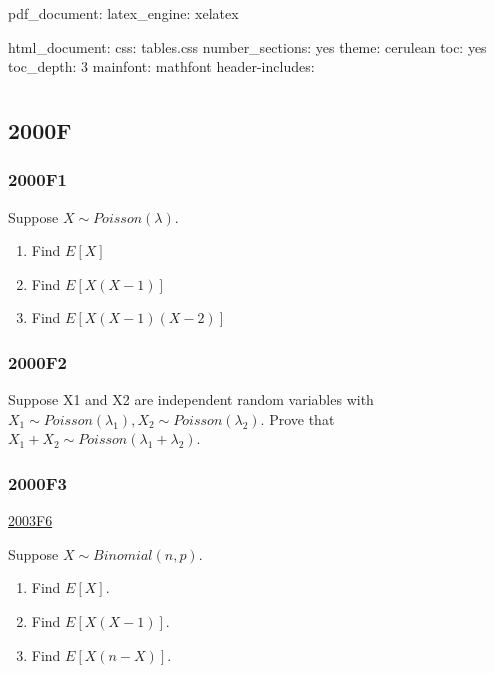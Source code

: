 \documentclass[6pt,Portrait]{article}
\title{}
\author{}
\date{}
\begin{document}
pdf\_document: latex\_engine: xelatex

html\_document: css: tables.css number\_sections: yes theme: cerulean
toc: yes toc\_depth: 3 mainfont: mathfont header-includes:

\begin{multicols}{1}


\end{multicols}

\hypertarget{section}{%
\section{}\label{section}}

\hypertarget{f}{%
\subsection{2000F}\label{f}}

\hypertarget{f1}{%
\subsubsection{2000F1}\label{f1}}

Suppose \(X\sim Poisson(\lambda)\).

\begin{enumerate}
\def\labelenumi{\Alph{enumi})}
\item
  Find \(E[X]\)
\item
  Find \(E[X(X-1)]\)
\item
  Find \(E[X(X-1)(X-2)]\)
\end{enumerate}

\hypertarget{f2}{%
\subsubsection{2000F2}\label{f2}}

Suppose X1 and X2 are independent random variables with
\(X_1\sim Poisson(\lambda_1),X_2\sim Poisson(\lambda_2)\). Prove that
\(X_1+X_2\sim Poisson(\lambda_1+\lambda_2)\).

\hypertarget{f3}{%
\subsubsection{2000F3}\label{f3}}

\protect\hyperlink{f6-1}{2003F6}

Suppose \(X\sim Binomial(n,p)\).

\begin{enumerate}
\def\labelenumi{\Alph{enumi})}
\item
  Find \(E[X]\).
\item
  Find \(E[X(X-1)]\).
\item
  Find \(E[X(n-X)]\).
\end{enumerate}
\end{document}
